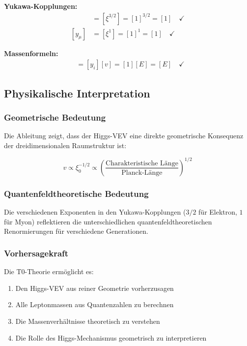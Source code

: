 \documentclass[12pt,a4paper]{article}
\theoremstyle{definition}
\begin{document}
\textbf{Yukawa-Kopplungen:}
\begin{align}
	[y_e] &= [\xi^{3/2}] = [1]^{3/2} = [1] \quad \checkmark\\
	[y_\mu] &= [\xi^1] = [1]^1 = [1] \quad \checkmark
\end{align}

\textbf{Massenformeln:}
\begin{align}
	[m_i] &= [y_i][v] = [1][E] = [E] \quad \checkmark
\end{align}

\subsection{Physikalische Interpretation}

\subsubsection{Geometrische Bedeutung}

Die Ableitung zeigt, dass der Higgs-VEV eine direkte geometrische Konsequenz der dreidimensionalen Raumstruktur ist:

\begin{equation}
	v \propto \xi_0^{-1/2} \propto \left(\frac{\text{Charakteristische L{\"a}nge}}{\text{Planck-L{\"a}nge}}\right)^{1/2}
\end{equation}

\subsubsection{Quantenfeldtheoretische Bedeutung}

Die verschiedenen Exponenten in den Yukawa-Kopplungen ($3/2$ f{\"u}r Elektron, $1$ f{\"u}r Myon) reflektieren die unterschiedlichen quantenfeldtheoretischen Renormierungen f{\"u}r verschiedene Generationen.

\subsubsection{Vorhersagekraft}

Die T0-Theorie erm{\"o}glicht es:

\begin{enumerate}
	\item Den Higgs-VEV aus reiner Geometrie vorherzusagen
	\item Alle Leptonmassen aus Quantenzahlen zu berechnen
	\item Die Massenverh{\"a}ltnisse theoretisch zu verstehen
	\item Die Rolle des Higgs-Mechanismus geometrisch zu interpretieren
\end{enumerate}
\end{document}
